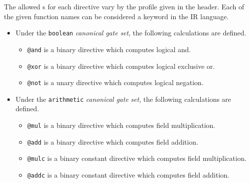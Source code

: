 The allowed s for each directive vary by the profile given in the header.
Each of the given function names can be considered a keyword in the IR language. \\

\begin{itemize}
  \item Under the \texttt{boolean} \textit{canonical gate set}, the following calculations are defined.
  \begin{itemize}
    \item \texttt{@and} is a binary directive which computes logical and.
    \item \texttt{@xor} is a binary directive which computes logical exclusive or.
    \item \texttt{@not} is a unary directive which computes logical negation.
  \end{itemize}
  \item Under the \texttt{arithmetic} \textit{canonical gate set}, the following calculations are defined.
  \begin{itemize}
    \item \texttt{@mul} is a binary directive which computes field multiplication.
    \item \texttt{@add} is a binary directive which computes field addition.
    \item \texttt{@mulc} is a binary constant directive which computes field multiplication.
    \item \texttt{@addc} is a binary constant directive which computes field addition.
  \end{itemize}
\end{itemize}

